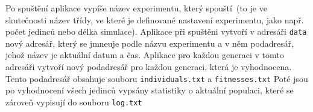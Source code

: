Po spuštění aplikace vypíše název experimentu, který spouští~(to je ve skutečnosti název třídy, ve které je definované nastavení experimentu, jako např. počet jedinců nebo délka simulace).
Aplikace při spuštěni vytvoří v adresáři \texttt{data} nový adresář, který se jmneuje podle názvu experimentu a v něm podadresář, jehož název je aktuální datum a čas.
Aplikace pro každou generaci v tomto adresáři vytvoří nový podadresář pro každou generaci, která je vyhodnocena.
Tento podadresář obsahuje souboru \texttt{individuals.txt} a \texttt{fitnesses.txt}
Poté jsou po vyhodnocení všech jedinců vypsány statistiky o aktuální populaci, které se zároveň vypisují do souboru \texttt{log.txt}





